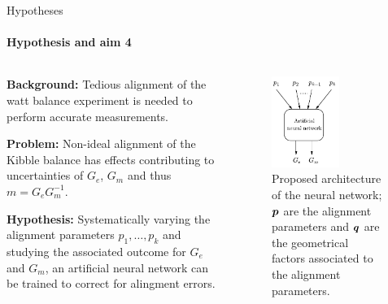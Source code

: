 \documentclass{beamer}
\begin{document}
\begin{frame}[allowframebreaks]{Hypotheses}
  \framesubtitle{Hypothesis and aim 4}

  \begin{columns}
    \begin{column}{0.59\textwidth}
\textbf{Background:} Tedious alignment of the watt balance experiment is needed to perform accurate measurements.

\textbf{Problem:} Non-ideal alignment of the Kibble balance has effects contributing to uncertainties of $G_e$, $G_m$ and thus $m=G_eG_m^{-1}$.

\textbf{Hypothesis:} Systematically varying the alignment parameters $p_1,\dots,p_k$ and studying the associated outcome for $G_e$ and $G_m$, an artificial neural network can be trained to correct for alingment errors.
    \end{column}
    
    \begin{column}{0.4\textwidth}
      \begin{figure}[h!] 
	\centering
	\includegraphics[width=0.6\textwidth]{figures/nn.pdf}
	\caption{Proposed architecture of the neural network; $\bm{p}$ are the alignment parameters and $\bm{q}$ are the geometrical factors associated to the alignment parameters.}
	\label{fig:nn}
      \end{figure}
    \end{column}
  \end{columns}
\end{frame}
\end{document}
